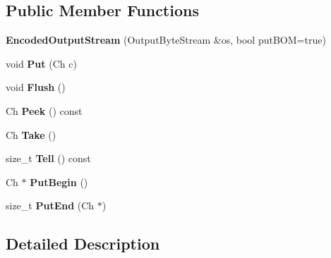 \subsection*{Public Member Functions}
\begin{DoxyCompactItemize}
\item 
{\bfseries Encoded\+Output\+Stream} (Output\+Byte\+Stream \&os, bool put\+B\+OM=true)\hypertarget{class_encoded_output_stream_ad3360c613a30a6a15526ae9ad63bd004}{}\label{class_encoded_output_stream_ad3360c613a30a6a15526ae9ad63bd004}

\item 
void {\bfseries Put} (Ch c)\hypertarget{class_encoded_output_stream_a0f3c00f94c195a38d78c05ecda497481}{}\label{class_encoded_output_stream_a0f3c00f94c195a38d78c05ecda497481}

\item 
void {\bfseries Flush} ()\hypertarget{class_encoded_output_stream_a657188f6a9f0fae01a4012c288d3fd46}{}\label{class_encoded_output_stream_a657188f6a9f0fae01a4012c288d3fd46}

\item 
Ch {\bfseries Peek} () const \hypertarget{class_encoded_output_stream_aa1dbe6b921fe788f3229024fb5598647}{}\label{class_encoded_output_stream_aa1dbe6b921fe788f3229024fb5598647}

\item 
Ch {\bfseries Take} ()\hypertarget{class_encoded_output_stream_a90f5a5e1598316a417ef5b6ad3d49f36}{}\label{class_encoded_output_stream_a90f5a5e1598316a417ef5b6ad3d49f36}

\item 
size\+\_\+t {\bfseries Tell} () const \hypertarget{class_encoded_output_stream_ab580ac97f1a22c2a6abc4a31bb5c8272}{}\label{class_encoded_output_stream_ab580ac97f1a22c2a6abc4a31bb5c8272}

\item 
Ch $\ast$ {\bfseries Put\+Begin} ()\hypertarget{class_encoded_output_stream_a78934de4f76c9fa65238e65d3630cbc5}{}\label{class_encoded_output_stream_a78934de4f76c9fa65238e65d3630cbc5}

\item 
size\+\_\+t {\bfseries Put\+End} (Ch $\ast$)\hypertarget{class_encoded_output_stream_a818695f6d3fa8896e9d7d0fbdc7d4514}{}\label{class_encoded_output_stream_a818695f6d3fa8896e9d7d0fbdc7d4514}

\end{DoxyCompactItemize}


\subsection{Detailed Description}
